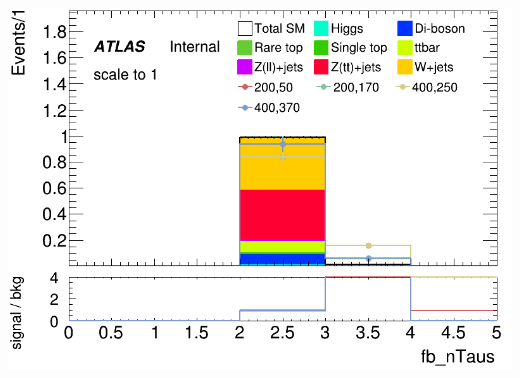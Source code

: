 \documentclass[usenames,dvipsnames]{beamer}
\begin{document}
\begin{frame}
\begin{minipage}{0.32\textwidth}
        \includegraphics[width=\textwidth]{graphics/HH_met_sig/HH_fb_nTaus_norm.png}
    \end{minipage}
    \vspace{0.5cm}
    

\end{frame}
\end{document}
